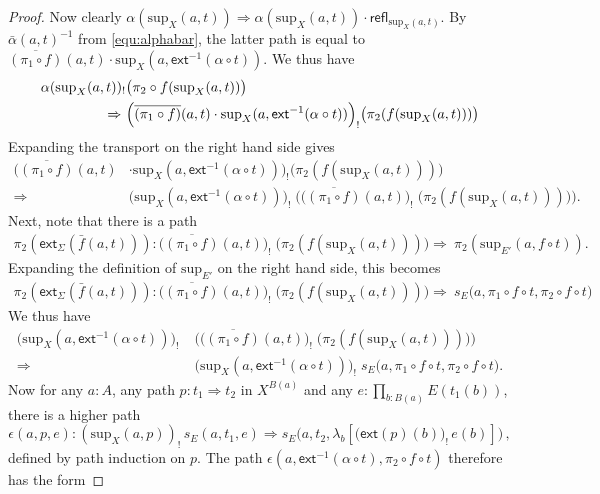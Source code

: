 \documentclass[10pt,a4paper,oneside,reqno]{amsart}
\theoremstyle{mythm}
\theoremstyle{mydef}
\theoremstyle{myrmk}
\newcommand{\com}{\circ}
\newcommand{\ct}{\cdot}
\newcommand{\ext}{\mathsf{ext}}
\newcommand{\refl}{\mathsf{refl}}
\newcommand{\lam}[1]{\lambda_{#1}}
\renewcommand{\sup}{\mathrm{sup}}
\begin{document}
\begin{proof}
Now clearly $\alpha(\sup_X(a,t)) \Rightarrow \alpha(\sup_X(a,t)) \ct \refl_{\sup_X(a,t)}$. 
By $\bar{\alpha}(a,t)^{-1}$ from \eqref{equ:alphabar}, the latter path is equal to $\overline{(\pi_1 \com f)}(a,t) \ct \sup_X(a,\ext^{-1}(\alpha \circ t))$. 
We thus have
\begin{align}
\alpha(\sup_X(a,t))_{!}& \big( \pi_2 \com f (\sup_X(a,t)) \big) \notag \\
 \Rightarrow\ &\Big(\overline{(\pi_1 \com f)}(a,t) \ct \sup_X(a,\ext^{-1}(\alpha \circ t))\Big)_{!} \big( \pi_2 (f (\sup_X(a,t))) \big) \label{eqnstart}
\end{align}
Expanding the transport on the right hand side gives
\begin{align*}
\Big(\overline{(\pi_1 \com f)}(a,t)& \ct \sup_X(a,\ext^{-1}(\alpha \circ t))\Big)_{!} \big( \pi_2 (f (\sup_X(a,t))) \big) \\
\Rightarrow &\big(\sup_X(a,\ext^{-1}(\alpha \circ t))\big)_{!} \; \Big( \big(\overline{(\pi_1 \com f)}(a,t)\big)_{!} \; \big(\pi_2 (f (\sup_X(a,t))) \big) \Big).
\end{align*}
%
Next, note that there is a path 
\begin{align*}
\pi_2(\ext_\Sigma(\bar{f}(a,t))) : \big(\overline{(\pi_1 \com f)}(a,t)\big)_{!} \; \big(\pi_2(f (\sup_X(a,t))) \big)
\Rightarrow\ \pi_2(\sup_{E'}(a, f \circ t)).
\end{align*}
Expanding the definition of $\sup_{E'}$ on the right hand side, this becomes
\begin{align*}
\pi_2(\ext_\Sigma(\bar{f}(a,t))) : \big(\overline{(\pi_1 \com f)}(a,t)\big)_{!} \; \big(\pi_2(f (\sup_X(a,t))) \big)
\Rightarrow\ s_E\big(a,\pi_1 \circ f \circ t, \pi_2 \circ f \circ t\big)
\end{align*}
We thus have
\begin{align*}
\big(\sup_X(a,\ext^{-1}(\alpha \circ t))\big)_{!} \;& \big( \big(\overline{(\pi_1 \com f)}(a,t)\big)_{!} \; \big(\pi_2 (f (\sup_X(a,t))) \big) \big) \\
\Rightarrow\ &\big(\sup_X(a,\ext^{-1}(\alpha \circ t))\big)_{!} \; s_E\big(a,\pi_1 \circ f \circ t, \pi_2 \circ f \circ t\big).
\end{align*}
%
Now for any $a : A$, any path $p : t_1 \Rightarrow t_2$ in $X^{B(a)}$ and any $e : \prod_{b:B(a)} E(t_1(b))$, there is a higher path 
\[ 
\epsilon(a,p,e) : (\sup_X(a,p))_{!}\, s_E(a,t_1,e) \Rightarrow s_E\big(a,t_2, \lam{b} [\big(\ext(p)(b)\big)_{!}\, e(b)]\big)\,, 
\]
defined by path induction on $p$.
The path $\epsilon(a,\ext^{-1}(\alpha \circ t),\pi_2 \circ f \circ t)$ therefore has the form

\end{proof}
\end{document}
